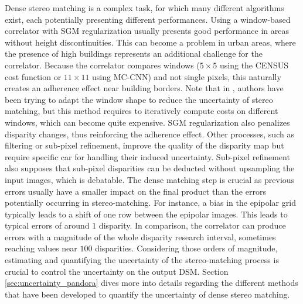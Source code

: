 Dense stereo matching is a complex task, for which many different algorithms exist, each potentially presenting different performances. Using a window-based correlator with SGM regularization usually presents good performance in areas without height discontinuities. This can become a problem in urban areas, where the presence of high buildings represents an additional challenge for the correlator. Because the correlator compares windows ($5\times5$ using the CENSUS cost function or $11\times11$ using MC-CNN) and not single pixels, this naturally creates an adherence effect near building borders. Note that in \cite{okutomi_stereo_1994}, authors have been trying to adapt the window shape to reduce the uncertainty of stereo matching, but this method requires to iteratively compute costs on different windows, which can become quite expensive. SGM regularization also penalizes disparity changes, thus reinforcing the adherence effect. Other processes, such as filtering or sub-pixel refinement, improve the quality of the disparity map but require specific car for handling their induced uncertainty. Sub-pixel refinement also supposes that sub-pixel disparities can be deducted without upsampling the input images, which is debatable. The dense matching step is crucial as previous errors usually have a smaller impact on the final product than the errors potentially occurring in stereo-matching. For instance, a bias in the epipolar grid typically leads to a shift of one row between the epipolar images. This leads to typical errors of around $1$ disparity. In comparison, the correlator can produce errors with a magnitude of the whole disparity research interval, sometimes reaching values near $100$ disparities. Considering those orders of magnitude, estimating and quantifying the uncertainty of the stereo-matching process is crucial to control the uncertainty on the output DSM. Section \ref{sec:uncertainty_pandora} dives more into details regarding the different methods that have been developed to quantify the uncertainty of dense stereo matching.

